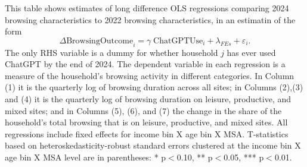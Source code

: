 \documentclass[12pt]{article}
\begin{document}
\begin{table}[htbp]
\caption{\\ \centering \textbf{OLS estimates of ChatGPT adoption on browsing activity by category}}  

\setlength{\abovedisplayskip}{0pt}
\setlength{\belowdisplayskip}{0.5pt}
\setlength{\abovedisplayshortskip}{0pt}
\setlength{\belowdisplayshortskip}{0.5pt}
\vspace{-0.1cm} \label{table:ols-bycat} \footnotesize  This table shows estimates of long difference OLS regressions comparing 2024 browsing characteristics to 2022 browsing characteristics, in an estimatin of the form
$$\Delta\text{BrowsingOutcome}_{i} = \gamma\; \text{ChatGPTUse}_{i}  + \lambda_{FEs}  + \varepsilon_{i}.$$
The only RHS variable is a dummy for whether household $j$ has ever used ChatGPT by the end of 2024. The dependent variable in each regression is a measure of the household's browsing activity in different categories. In Column (1) it is the quarterly log of browsing duration across all sites; in Columns (2),(3) and (4) it is the quarterly log of browsing duration on  leisure, productive, and mixed sites; and in Columns (5), (6), and (7) the change in the share of the household's total browsing that is  on  leisure, productive, and mixed sites. All regressions include fixed effects for income bin X age bin X MSA. T-statistics based on heteroskedasticity-robust standard errors clustered at the income bin X age bin X MSA level are in parentheses: * p$<$0.10, ** p$<$0.05, *** p$<$0.01.  \vspace{0.1cm}


\end{table}
\end{document}
